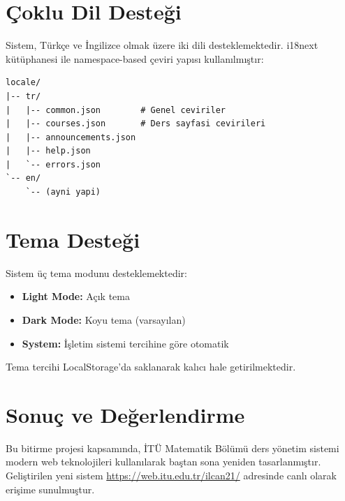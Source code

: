 \documentclass[12pt,a4paper]{article}
\begin{document}
\section{Çoklu Dil Desteği}

Sistem, Türkçe ve İngilizce olmak üzere iki dili desteklemektedir. i18next kütüphanesi ile namespace-based çeviri yapısı kullanılmıştır:

\begin{lstlisting}[basicstyle=\ttfamily\small]
locale/
|-- tr/
|   |-- common.json        # Genel ceviriler
|   |-- courses.json       # Ders sayfasi cevirileri
|   |-- announcements.json
|   |-- help.json
|   `-- errors.json
`-- en/
    `-- (ayni yapi)
\end{lstlisting}

\section{Tema Desteği}

Sistem üç tema modunu desteklemektedir:
\begin{itemize}
    \item \textbf{Light Mode:} Açık tema
    \item \textbf{Dark Mode:} Koyu tema (varsayılan)
    \item \textbf{System:} İşletim sistemi tercihine göre otomatik
\end{itemize}

Tema tercihi LocalStorage'da saklanarak kalıcı hale getirilmektedir.

\section{Sonuç ve Değerlendirme}

Bu bitirme projesi kapsamında, İTÜ Matematik Bölümü ders yönetim sistemi modern web teknolojileri kullanılarak baştan sona yeniden tasarlanmıştır. Geliştirilen yeni sistem \url{https://web.itu.edu.tr/ilcan21/} adresinde canlı olarak erişime sunulmuştur.
\end{document}
